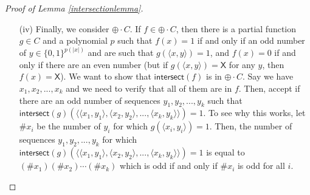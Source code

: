 \documentclass[11pt]{article}
\newcommand{\parity}{\oplus}
\newcommand{\x}{\textsf{X}}
\newcommand{\intersect}{\textsf{intersect}}
\begin{document}
\begin{proof}[Proof of Lemma \ref{intersectionlemma}]
\begin{enumerate}
\item[(iv)] Finally, we consider $\parity \cdot C$. If $f \in \parity \cdot C$, then there is a partial function $g \in C$ and a polynomial $p$ such that $f(x) = 1$ if and only if an odd number of $y \in \{0,1\}^{p(|x|)}$ and are such that $g(\langle x, y\rangle) = 1$, and $f(x) = 0$ if and only if there are an even number (but if $g(\langle x,y\rangle) = \x$ for any $y$, then $f(x) = \x$). We want to show that $\intersect(f)$ is in $\parity \cdot C$. Say we have $x_1,x_2,...,x_k$ and we need to verify that all of them are in $f$. Then, accept if there are an odd number of sequences $y_1,y_2,...,y_k$ such that $\intersect(g)(\langle\langle x_1,y_1\rangle,\langle x_2,y_2\rangle,...,\langle x_k,y_k\rangle\rangle) = 1$. To see why this works, let $\# x_i$ be the number of $y_i$ for which $g(\langle x_i,y_i\rangle) = 1$. Then, the number of sequences $y_1,y_2,...,y_k$ for which $\intersect(g)(\langle\langle x_1,y_1\rangle,\langle x_2,y_2\rangle,...,\langle x_k,y_k\rangle\rangle) = 1$ is equal to $(\# x_1)(\# x_2)\cdots(\# x_k)$ which is odd if and only if $\# x_i$ is odd for all $i$.
\end{enumerate}
\end{proof}
\end{document}
